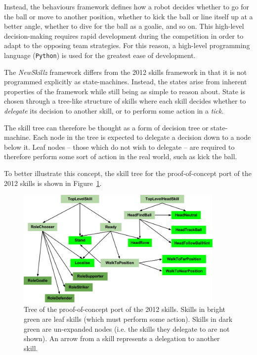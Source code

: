 Instead, the behaviours framework defines how a robot decides whether to go for the ball or move to another position, whether to kick the ball or line itself up at a better angle, whether to dive for the ball as a goalie, and so on. This high-level decision-making requires rapid development during the competition in order to adapt to the opposing team strategies. For this reason, a high-level programming language (\verb!Python!) is used for the greatest ease of development.

The \textit{NewSkillz} framework differs from the 2012 skills framework in that it is not programmed explicitly as state-machines. Instead, the states arise from inherent properties of the framework while still being as simple to reason about. State is chosen through a tree-like structure of skills where each skill decides whether to \textit{delegate} its decision to another skill, or to perform some action in a \textit{tick}.

The skill tree can therefore be thought as a form of decision tree or state-machine. Each node in the tree is expected to delegate a decision down to a node below it. Leaf nodes -- those which do not wish to delegate -- are required to therefore perform some sort of action in the real world, such as kick the ball.

To better illustrate this concept, the skill tree for the proof-of-concept port of the 2012 skills is shown in Figure~\ref{fig:skill_tree}.

\begin{figure}[h]
\centering
\includegraphics[width=0.9\textwidth]{img/skill_tree.png}
\caption{Tree of the proof-of-concept port of the 2012 skills. Skills in bright green are leaf skills (which must perform some action). Skills in dark green are un-expanded nodes (i.e. the skills they delegate to are not shown). An arrow from a skill represents a delegation to another skill.}
\label{fig:skill_tree}
\end{figure}


